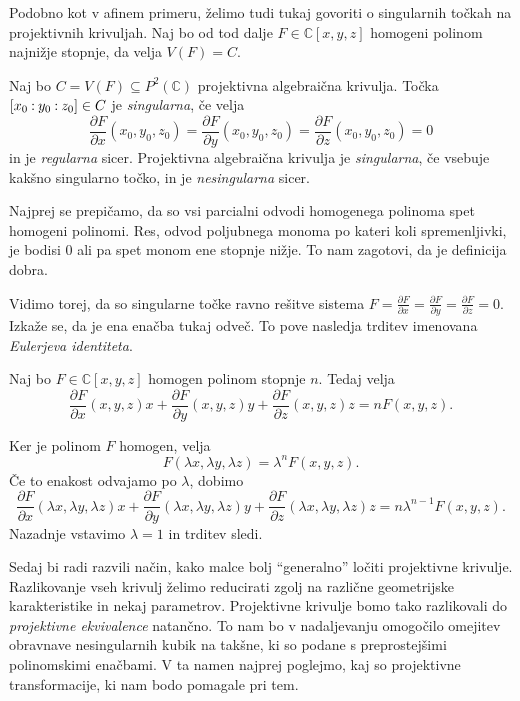 \documentclass[mat1]{fmfdelo}
\newcommand{\C}{\mathbb C}
\newcommand{\PC}{P^2(\mathbb C)}
\newcommand{\Cxyz}{\C[x,y,z]}
\newcommand{\pcoor}[1]{%
  \begingroup\lccode`~=`: \lowercase{\endgroup
  \edef~}{\mathbin{\mathchar\the\mathcode`:}\nobreak}%
  [%
  \begingroup
  \mathcode`:=\string"8000
  #1%
  \endgroup
  ]%
}
\newcommand{\pdv}[2][]{\frac{\partial#1}{\partial#2}}
\theoremstyle{definition}
\begin{document}
Podobno kot v afinem primeru, želimo tudi tukaj govoriti o singularnih točkah na projektivnih krivuljah. Naj bo od tod dalje $F \in \C[x,y,z]$ homogeni polinom najnižje stopnje, da velja $V(F) = C$.

\begin{definicija}
    Naj bo $C = V(F) \subseteq \PC$ projektivna algebraična krivulja. Točka $\pcoor{x_0:y_0:z_0} \in C$ je \emph{singularna}, če velja
    \[
        \pdv[F]{x}(x_0, y_0, z_0) = \pdv[F]{y}(x_0, y_0, z_0) = \pdv[F]{z}(x_0, y_0, z_0) = 0
    \]
    in je \emph{regularna} sicer. Projektivna algebraična krivulja je \emph{singularna}, če vsebuje kakšno singularno točko, in je \emph{nesingularna} sicer.
\end{definicija}

Najprej se prepičamo, da so vsi parcialni odvodi homogenega polinoma spet homogeni polinomi. Res, odvod poljubnega monoma po kateri koli spremenljivki, je bodisi $0$ ali pa spet monom ene stopnje nižje. To nam zagotovi, da je definicija dobra.

Vidimo torej, da so singularne točke ravno rešitve sistema $F = \pdv[F]{x}= \pdv[F]{y} = \pdv[F]{z} = 0$.
Izkaže se, da je ena enačba tukaj odveč. To pove nasledja trditev imenovana \emph{Eulerjeva identiteta}.

\begin{trditev}
    Naj bo $F \in \Cxyz$ homogen polinom stopnje $n$. Tedaj velja
    \[
        \pdv[F]{x}(x,y,z)x + \pdv[F]{y}(x,y,z)y + \pdv[F]{z}(x,y,z)z = nF(x,y,z). 
    \]
\end{trditev}

\begin{dokaz}
    Ker je polinom $F$ homogen, velja 
    $$ F(\lambda x, \lambda y, \lambda z) = \lambda^n F(x,y,z).$$
    Če to enakost odvajamo po $\lambda$, dobimo
    $$ \pdv[F]{x}(\lambda x,\lambda y,\lambda z)x + 
    \pdv[F]{y}(\lambda x,\lambda y,\lambda z) y + 
    \pdv[F]{z}(\lambda x,\lambda y,\lambda z) z = n\lambda^{n-1}F(x,y,z).$$
    Nazadnje vstavimo $\lambda = 1$ in trditev sledi.
\end{dokaz}

Sedaj bi radi razvili način, kako malce bolj ``generalno'' ločiti projektivne krivulje. Razlikovanje vseh krivulj želimo reducirati zgolj na različne geometrijske karakteristike in nekaj parametrov. 
Projektivne krivulje bomo tako razlikovali do \emph{projektivne ekvivalence} natančno. 
To nam bo v nadaljevanju omogočilo omejitev obravnave nesingularnih kubik na takšne, ki so podane s preprostejšimi polinomskimi enačbami.
V ta namen najprej poglejmo, kaj so projektivne transformacije, ki nam bodo pomagale pri tem.
\end{document}
